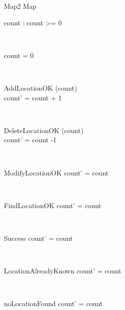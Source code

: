 \documentclass[12pt]{article}
\begin{document}
\begin{spacing}{1.5}
\begin{class}{Map2}
\also
Map \\
\begin{state}
count : 
\where
count >= 0
\end{state} \\
\begin{init}
count = 0
\end{init} \\
\begin{op}{AddLocationOK}
\Delta (count) \\
\ST
count' = count + 1
\end{op}\\
\begin{op}{DeleteLocationOK}
\Delta (count) \\
\ST
count' = count -1
\end{op}\\
\begin{op}{ModifyLocationOK}
\ST
count' = count
\end{op}\\ 
\begin{op}{FindLocationOK}
\ST
count' = count
\end{op}\\
\begin{op}{Success}
\ST
count' = count
\end{op}\\
\begin{op}{LocationAlreadyKnown}
\ST
count' = count
\end{op}\\ 
\begin{op}{noLocationFound}
\ST
count' = count
\end{op}\\
\end{class}




\end{spacing}
\end{document}
